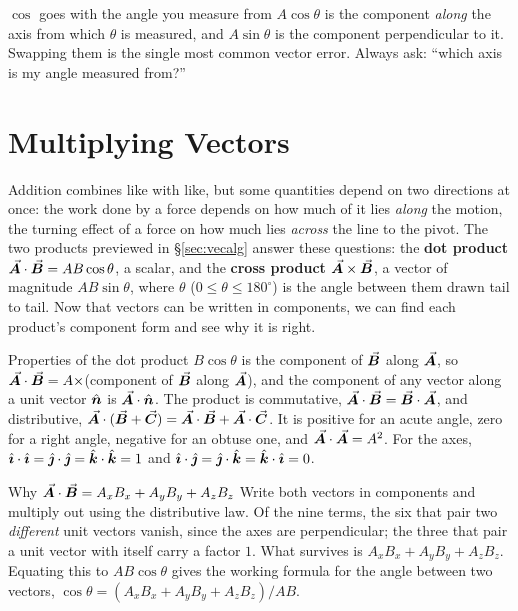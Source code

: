 \begin{trapbox}{$\cos$ goes with the angle you measure from}
$A\cos\theta$ is the component \emph{along} the axis from which $\theta$ is measured, and $A\sin\theta$
is the component perpendicular to it. Swapping them is the single most common vector error. Always ask:
``which axis is my angle measured from?''
\end{trapbox}

\section{Multiplying Vectors}\label{sec:vecprod}

Addition combines like with like, but some quantities depend on two directions at once: the work done
by a force depends on how much of it lies \emph{along} the motion, the turning effect of a force on how
much lies \emph{across} the line to the pivot. The two products previewed in \S\ref{sec:vecalg}
answer these questions: the \textbf{dot product} $\vec{\bm{A}}\cdot\vec{\bm{B}}=AB\cos\theta$, a scalar, and the
\textbf{cross product} $\vec{\bm{A}}\times\vec{\bm{B}}$, a vector of magnitude $AB\sin\theta$, where $\theta$
($0\le\theta\le180^\circ$) is the angle between them drawn tail to tail. Now that vectors can be
written in components, we can find each product's component form and see why it is right.

\begin{keybox}{Properties of the dot product}
$B\cos\theta$ is the component of $\vec{\bm{B}}$ along $\vec{\bm{A}}$, so $\vec{\bm{A}}\cdot\vec{\bm{B}}=A\times$(component of
$\vec{\bm{B}}$ along $\vec{\bm{A}}$), and the component of any vector along a unit vector $\hat{\bm{n}}$ is
$\vec{\bm{A}}\cdot\hat{\bm{n}}$. The product is commutative, $\vec{\bm{A}}\cdot\vec{\bm{B}}=\vec{\bm{B}}\cdot\vec{\bm{A}}$, and distributive,
$\vec{\bm{A}}\cdot(\vec{\bm{B}}+\vec{\bm{C}})=\vec{\bm{A}}\cdot\vec{\bm{B}}+\vec{\bm{A}}\cdot\vec{\bm{C}}$. It is positive for an acute angle, zero
for a right angle, negative for an obtuse one, and $\vec{\bm{A}}\cdot\vec{\bm{A}}=A^2$. For the axes,
$\hat{\bm{\imath}}\cdot\hat{\bm{\imath}}=\hat{\bm{\jmath}}\cdot\hat{\bm{\jmath}}=\hat{\bm{k}}\cdot\hat{\bm{k}}=1$ and $\hat{\bm{\imath}}\cdot\hat{\bm{\jmath}}=\hat{\bm{\jmath}}\cdot\hat{\bm{k}}=\hat{\bm{k}}\cdot\hat{\bm{\imath}}=0$.
\end{keybox}

\begin{derivbox}{Why $\vec{\bm{A}}\cdot\vec{\bm{B}}=A_xB_x+A_yB_y+A_zB_z$}
Write both vectors in components and multiply out using the distributive law. Of the nine terms, the six
that pair two \emph{different} unit vectors vanish, since the axes are perpendicular; the three that pair
a unit vector with itself carry a factor $1$. What survives is $A_xB_x+A_yB_y+A_zB_z$. Equating this to
$AB\cos\theta$ gives the working formula for the angle between two vectors,
$\cos\theta=(A_xB_x+A_yB_y+A_zB_z)/AB$.
\end{derivbox}

